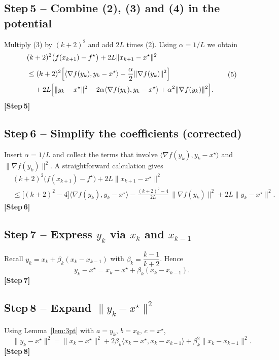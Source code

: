 \documentclass{article}
\begin{document}
\subsection*{Step 5 – Combine (2), (3) and (4) in the potential}
Multiply (3) by $(k+2)^{2}$ and add $2L$ times (2). Using $\alpha=1/L$ we obtain
\[
\begin{aligned}
&(k+2)^{2}\bigl(f(x_{k+1})-f^{\star}\bigr)
   +2L\|x_{k+1}-x^{\star}\|^{2}\\[4pt]
&\le (k+2)^{2}\Bigl[\langle\nabla f(y_{k}),y_{k}-x^{\star}\rangle
            -\frac{\alpha}{2}\|\nabla f(y_{k})\|^{2}\Bigr]   \\
&\quad+2L\Bigl[\|y_{k}-x^{\star}\|^{2}
        -2\alpha\langle\nabla f(y_{k}),y_{k}-x^{\star}\rangle
        +\alpha^{2}\|\nabla f(y_{k})\|^{2}\Bigr].
\end{aligned}
\tag{5}
\]
\textbf{[Step 5]}

\subsection*{Step 6 – Simplify the coefficients (corrected)}
Insert $\alpha=1/L$ and collect the terms that involve $\langle\nabla f(y_{k}),y_{k}-x^{\star}\rangle$ and $\|\nabla f(y_{k})\|^{2}$.
A straightforward calculation gives
\[
\begin{aligned}
&(k+2)^{2}\bigl(f(x_{k+1})-f^{\star}\bigr)
   +2L\|x_{k+1}-x^{\star}\|^{2}\\[4pt]
&\le \bigl[(k+2)^{2}-4\bigr]\langle\nabla f(y_{k}),y_{k}-x^{\star}\rangle
   -\frac{(k+2)^{2}-4}{2L}\,\|\nabla f(y_{k})\|^{2}
   +2L\|y_{k}-x^{\star}\|^{2}.
\end{aligned}
\tag{6}
\]
\textbf{[Step 6]}\; %

\subsection*{Step 7 – Express $y_{k}$ via $x_{k}$ and $x_{k-1}$}
Recall $y_{k}=x_{k}+ \beta_{k}(x_{k}-x_{k-1})$ with $\beta_{k}=\dfrac{k-1}{k+2}$.
Hence
\[
y_{k}-x^{\star}=x_{k}-x^{\star}+\beta_{k}(x_{k}-x_{k-1}).
\tag{7}
\]
\textbf{[Step 7]}

\subsection*{Step 8 – Expand $\|y_{k}-x^{\star}\|^{2}$}
Using Lemma~\ref{lem:3pt} with $a=y_{k},\,b=x_{k},\,c=x^{\star}$,
\[
\|y_{k}-x^{\star}\|^{2}
 =\|x_{k}-x^{\star}\|^{2}
   +2\beta_{k}\langle x_{k}-x^{\star},x_{k}-x_{k-1}\rangle
   +\beta_{k}^{2}\|x_{k}-x_{k-1}\|^{2}.
\tag{8}
\]
\textbf{[Step 8]}
\end{document}
